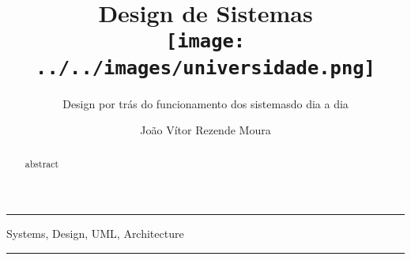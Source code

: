 \documentclass[12pt, a4paper]{paper}
\title{Design de Sistemas\\
  \hfill\texttt{[image: ../../images/universidade.png]}
  \vspace{-3cm}
}
\subtitle{Design por trás do funcionamento dos sistemas\newline do dia a dia}
\author{João Vítor Rezende Moura}
\begin{document}
\maketitle

\hrule
\begin{abstract}
  abstract
\end{abstract}
\vspace{-0.6cm} %
\begin{keywords}
  Systems, Design, UML, Architecture
\end{keywords}
\hrule
\end{document}
